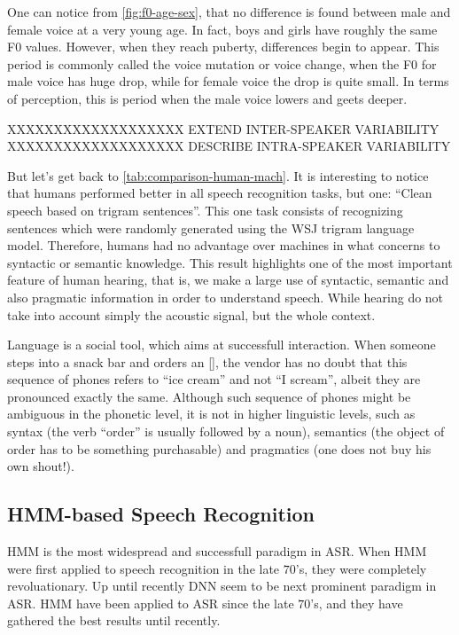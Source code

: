 One can notice from \autoref{fig:f0-age-sex}, that no difference is found between male and female voice at a very young age. 
In fact, boys and girls have roughly the same \ac{F0} values. However, when they reach puberty, differences begin to appear. 
This period is commonly called the voice mutation or voice change, when the \ac{F0} for male voice has huge drop, while 
for female voice the drop is quite small. In terms of perception, this is period when the male voice lowers and geets deeper.

XXXXXXXXXXXXXXXXXXX EXTEND INTER-SPEAKER VARIABILITY
XXXXXXXXXXXXXXXXXXX DESCRIBE INTRA-SPEAKER VARIABILITY

But let's get back to \autoref{tab:comparison-human-mach}. It is interesting to notice that humans
performed better in all speech recognition tasks, but one: ``Clean speech based on trigram sentences''.
This one task consists of recognizing sentences which were randomly generated using the WSJ trigram language model. 
Therefore, humans had no advantage over machines in what concerns to syntactic or semantic knowledge. 
This result highlights one of the most important feature of human hearing, that is, we make a large use of syntactic, 
semantic and also pragmatic information in order to understand speech. While hearing do not take into account simply 
the acoustic signal, but the whole context. 

Language is a social tool, which aims at successfull interaction. When someone steps into a snack bar and orders 
an [], the vendor has no doubt that this sequence of phones refers to ``ice cream'' and not ``I scream'', 
albeit they are pronounced exactly the same. Although such sequence of phones might be ambiguous in the phonetic level,
it is not in higher linguistic levels, such as syntax (the verb ``order'' is usually followed by a noun), semantics 
(the object of order has to be something purchasable) and pragmatics (one does not buy his own shout!).


\subsection{HMM-based Speech Recognition} 
\ac{HMM} is the most widespread and successfull paradigm in \ac{ASR}. When \ac{HMM} were first applied
to speech recognition in the late $70$'s, they were completely revoluationary.
Up until recently \ac{DNN} seem to be next prominent paradigm in \ac{ASR}.
\ac{HMM} have been applied
to \ac{ASR} since the late $70$'s, and they have gathered the best results until recently.

